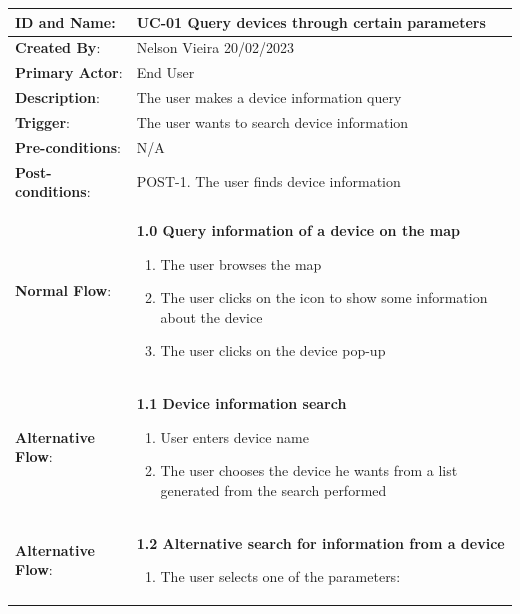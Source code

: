 \begin{table}[H]
    \centering
    \begin{adjustbox}{width=1.2\textwidth,center=\textwidth}
        \begin{tabular}{|m{4cm}|m{12cm}|}
            \hline
            \textbf{ID and Name}: & UC-01 Query devices through certain parameters \\
            \hline
            \textbf{Created By}: & Nelson Vieira 20/02/2023 \\
            \hline
            \textbf{Primary Actor}: & End User \\
            \hline
            \textbf{Description}: & The user makes a device information query \\
            \hline
            \textbf{Trigger}: & The user wants to search device information \\
            \hline
            \textbf{Pre-conditions}: & N/A \\
            \hline
            \textbf{Post-conditions}: & POST-1. The user finds device information \\
            \hline
            \textbf{Normal Flow}: & \textbf{1.0 Query information of a device on the map}
            \begin{enumerate}
                \item The user browses the map
                \item The user clicks on the icon to show some information about the device
                \item The user clicks on the device pop-up
            \end{enumerate} \\
            \hline
            \textbf{Alternative Flow}: & \textbf{1.1 Device information search}
            \begin{enumerate}
                \item User enters device name
                \item The user chooses the device he wants from a list generated from the search performed
            \end{enumerate} \\
            \hline
            \textbf{Alternative Flow}: & \textbf{1.2 Alternative search for information from a device}
            \begin{enumerate}
                \item The user selects one of the parameters:
                \begin{enumerate}

\end{enumerate}
\end{enumerate}
\end{tabular}
\end{adjustbox}
\end{table}
